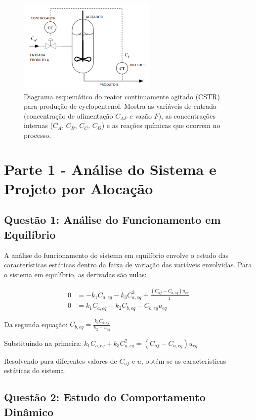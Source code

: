 \documentclass[a4paper,12pt]{article}
\begin{document}
\begin{figure}[ht]
  \centering
  \includegraphics[width=0.6\textwidth]{Imagens/Reator.png}
  \caption{Diagrama esquemático do reator continuamente agitado (CSTR) para produção de cyclopentenol. Mostra as variáveis de entrada (concentração de alimentação $C_{AF}$ e vazão $F$), as concentrações internas ($C_A$, $C_B$, $C_C$, $C_D$) e as reações químicas que ocorrem no processo.}
\end{figure}

\newpage

\section{Parte 1 - Análise do Sistema e Projeto por Alocação}

\subsection{Questão 1: Análise do Funcionamento em Equilíbrio}

A análise do funcionamento do sistema em equilíbrio envolve o estudo das características estáticas dentro da faixa de variação das variáveis envolvidas. Para o sistema em equilíbrio, as derivadas são nulas:

\begin{align}
0 &= -k_1 C_{a,eq} - k_3 C_{a,eq}^2 + \frac{(C_{af} - C_{a,eq}) u_{eq}}{1} \\
0 &= k_1 C_{a,eq} - k_2 C_{b,eq} - C_{b,eq} u_{eq}
\end{align}

Da segunda equação: $C_{b,eq} = \frac{k_1 C_{a,eq}}{k_2 + u_{eq}}$

Substituindo na primeira: $k_1 C_{a,eq} + k_3 C_{a,eq}^2 = (C_{af} - C_{a,eq}) u_{eq}$

Resolvendo para diferentes valores de $C_{af}$ e $u$, obtém-se as características estáticas do sistema.

\subsection{Questão 2: Estudo do Comportamento Dinâmico}
\end{document}
